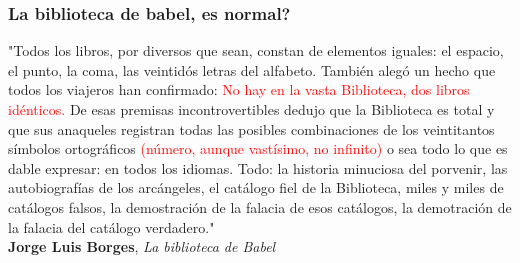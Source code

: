 \begin{frame}
\frametitle{La biblioteca de babel, es normal?}
"Todos los libros, por diversos que sean, constan de elementos iguales: el espacio, el punto, la coma, las veintidós letras del alfabeto. También alegó un hecho que todos los viajeros han confirmado: \textcolor{red}{No hay en la vasta Biblioteca, dos libros idénticos.} De esas premisas incontrovertibles dedujo que la Biblioteca es total y que sus anaqueles registran todas las posibles combinaciones de los veintitantos símbolos ortográficos \textcolor{red}{(número, aunque vastísimo, no infinito)} o sea todo lo que es dable expresar: en todos los idiomas. Todo: la historia minuciosa del porvenir, las autobiografías de los arcángeles, el catálogo fiel de la Biblioteca, miles y miles de catálogos falsos, la demostración de la falacia de esos catálogos, la demotración de la falacia del catálogo verdadero."\\ \textbf{Jorge Luis Borges}, \textit{La biblioteca de Babel}
\end{frame}

